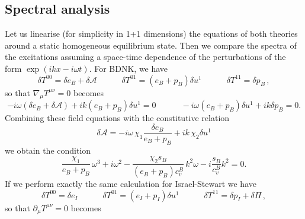 \documentclass[12pt,onecolumn,showpacs,amssymb,aps,nofootinbib,floatfix]{revtex4-2}
\begin{document}
	\subsection{Spectral analysis\label{spectral}}
	
	
	Let us linearise (for simplicity in 1+1 dimensions) the equations of both theories around a static homogeneous equilibrium state. Then we compare the spectra of the excitations assuming a space-time dependence of the perturbations of the form $\exp(ikx-i\omega t)$. For BDNK, we have
	\begin{equation}
		\delta T^{00} = \delta e_B + \delta \mathcal{A}  \quad \quad \quad  \delta T^{01} =(e_B  + p_B) \delta u^1  \quad \quad \quad  \delta T^{11} = \delta p_B \, ,
	\end{equation}
	so that $\nabla_\mu T^{\mu \nu}=0$ becomes
	\begin{equation}
		-i\omega (\delta e_B + \delta \mathcal{A}) + ik (e_B  + p_B) \delta u^1 =0  \quad \quad \quad -i\omega (e_B  + p_B) \delta u^1 + ik \delta p_B =0.
	\end{equation}
	Combining these field equations with the constitutive relation
	\begin{equation}
		\delta \mathcal{A}= -i \omega \, \chi_1 \frac{\delta e_B}{e_B +p_B} +ik \, \chi_2 \delta u^1
	\end{equation}
	we obtain the condition
	\begin{equation}\label{spectrumBDNK}
		\frac{\chi_1}{e_B+p_B} \, \omega^3 + i \omega^2 - \frac{\chi_2 s_B}{(e_B+p_B)c_v^B} \, k^2 \omega - i\frac{s_B}{c_v^B} k^2 =0.
	\end{equation}
	If we perform exactly the same calculation for Israel-Stewart we have
	\begin{equation}
		\delta T^{00} = \delta e_I   \quad \quad \quad  \delta T^{01} =(e_I  + p_I) \delta u^1  \quad \quad \quad  \delta T^{11} = \delta p_I +\delta \Pi \, ,
	\end{equation}
	so that $\partial_\mu T^{\mu \nu}=0$ becomes
\end{document}
